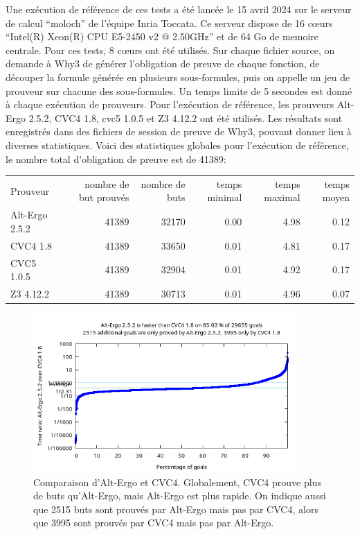 \documentclass[a4paper,11pt]{article}
\begin{document}
Une exécution de référence de ces tests a été lancée le 15 avril 2024
sur le serveur de calcul ``moloch'' de l'équipe Inria Toccata. Ce
serveur dispose de 16 c{\oe}urs ``Intel(R) Xeon(R) CPU E5-2450 v2 @
2.50GHz'' et de 64 Go de memoire centrale. Pour ces tests, 8 c{\oe}urs
ont été utilisés. Sur chaque fichier source, on demande à Why3 de
générer l'obligation de preuve de chaque fonction, de découper la
formule générée en plusieurs sous-formules, puis on appelle un jeu de
prouveur sur chacune des sous-formules. Un temps limite de 5 secondes est donné à chaque exécution de prouveurs. Pour l'exécution de référence,
les prouveurs Alt-Ergo 2.5.2, CVC4 1.8, cvc5 1.0.5 et Z3 4.12.2 ont
été utilisés. Les résultats sont enregistrés dans des fichiers de
session de preuve de Why3, pouvant donner lieu à diverses
statistiques. Voici des statistiques globales pour l'exécution de
référence, le nombre total d'obligation de preuve est de 41389:
\begin{center}
  \begin{tabular}{|l|r|r|r|r|r|}
  \rowcolor{gray!50} Prouveur
  & \multicolumn{1}{p{0.13\textwidth}|}{nombre de but prouvés }
  & \multicolumn{1}{p{0.13\textwidth}|}{nombre de buts}
  & \multicolumn{1}{p{0.13\textwidth}|}{temps minimal}
  & \multicolumn{1}{p{0.13\textwidth}|}{temps maximal}
  & \multicolumn{1}{p{0.13\textwidth}|}{temps moyen}
  \\
  Alt-Ergo 2.5.2                & 41389 & 32170 &  0.00  & 4.98 &  0.12 \\
  CVC4 1.8                      & 41389 & 33650 &  0.01  & 4.81 &  0.17 \\
  CVC5 1.0.5                    & 41389 & 32904 &  0.01  & 4.92 &  0.17 \\
  Z3 4.12.2                     & 41389 & 30713 &  0.01  & 4.96 &  0.07
\end{tabular}
\end{center}

\begin{figure}
  \centering
  \includegraphics[width=0.9\textwidth]{AE-vs-CVC4.png}
  \caption{Comparaison d'Alt-Ergo et CVC4. Globalement, CVC4 prouve
    plus de buts qu'Alt-Ergo, mais Alt-Ergo est plus rapide. On
    indique aussi que 2515 buts sont prouvés par Alt-Ergo mais pas par
    CVC4, alors que 3995 sont prouvés par CVC4 mais pas par Alt-Ergo.}
  \label{fig:AEvsCVC4}
\end{figure}
\end{document}
